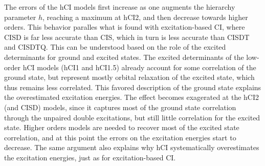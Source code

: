 \documentclass[aip,jcp,reprint,noshowkeys,superscriptaddress]{revtex4-1}
\begin{document}

The errors of the hCI models first increase as one augments the hierarchy parameter $h$, reaching a maximum at hCI2, and then decrease towards higher orders.
This behavior paralles what is found with excitation-based CI, where CISD is far less accurate than CIS, which in turn is less accurate than CISDT and CISDTQ.
This can be understood based on the role of the excited determinants for ground and excited states.
The excited determinants of the low-order hCI models (hCI1 and hCI1.5) already account for some correlation of the ground state,
but represent mostly orbital relaxation of the excited state, which thus remains less correlated.
This favored description of the ground state explains the overestimated excitation energies.
The effect becomes exagerated at the hCI2 (and CISD) models, since it captures most of the ground state correlation through the unpaired double excitations,
but still little correlation for the excited state.
Higher orders models are needed to recover most of the excited state correlation, and at this point the errors on the excitation energies start to decrease.
The same argument also explains why hCI systematically overestimates the excitation energies, just as for excitation-based CI.

\end{document}
